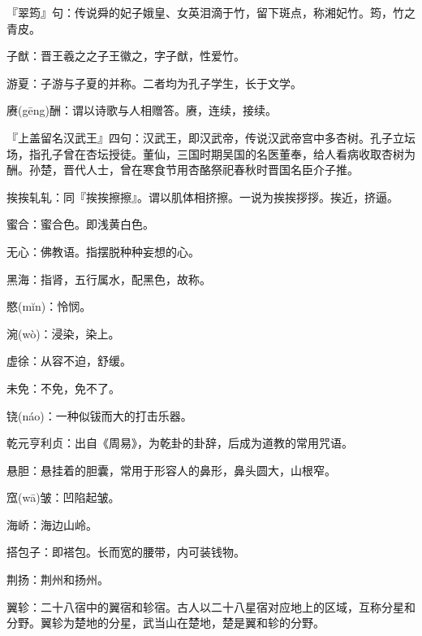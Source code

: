 \startbuffer[1863]
『翠筠』句：传说舜的妃子娥皇、女英泪滴于竹，留下斑点，称湘妃竹。筠，竹之青皮。
\stopbuffer


\startbuffer[1864]
子猷：晋王羲之之子王徽之，字子猷，性爱竹。
\stopbuffer


\startbuffer[1865]
游夏：子游与子夏的并称。二者均为孔子学生，长于文学。
\stopbuffer


\startbuffer[1866]
赓(gēng)酬：谓以诗歌与人相赠答。赓，连续，接续。
\stopbuffer


\startbuffer[1867]
『上盖留名汉武王』四句：汉武王，即汉武帝，传说汉武帝宫中多杏树。孔子立坛场，指孔子曾在杏坛授徒。董仙，三国时期吴国的名医董奉，给人看病收取杏树为酬。孙楚，晋代人士，曾在寒食节用杏酪祭祀春秋时晋国名臣介子推。
\stopbuffer


\startbuffer[1868]
挨挨轧轧：同『挨挨擦擦』。谓以肌体相挤擦。一说为挨挨拶拶。挨近，挤逼。
\stopbuffer


\startbuffer[1869]
蜜合：蜜合色。即浅黄白色。
\stopbuffer


\startbuffer[1870]
无心：佛教语。指摆脱种种妄想的心。
\stopbuffer


\startbuffer[1871]
黑海：指肾，五行属水，配黑色，故称。
\stopbuffer


\startbuffer[1872]
愍(mĭn)：怜悯。
\stopbuffer


\startbuffer[1873]
涴(wò)：浸染，染上。
\stopbuffer


\startbuffer[1874]
虚徐：从容不迫，舒缓。
\stopbuffer


\startbuffer[1875]
未免：不免，免不了。
\stopbuffer


\startbuffer[1876]
铙(náo)：一种似钹而大的打击乐器。
\stopbuffer


\startbuffer[1877]
乾元亨利贞：出自《周易》，为乾卦的卦辞，后成为道教的常用咒语。
\stopbuffer


\startbuffer[1878]
悬胆：悬挂着的胆囊，常用于形容人的鼻形，鼻头圆大，山根窄。
\stopbuffer


\startbuffer[1879]
窊(wā)皱：凹陷起皱。
\stopbuffer


\startbuffer[1880]
海峤：海边山岭。
\stopbuffer


\startbuffer[1881]
搭包子：即褡包。长而宽的腰带，内可装钱物。
\stopbuffer


\startbuffer[1882]
荆扬：荆州和扬州。
\stopbuffer


\startbuffer[1883]
翼轸：二十八宿中的翼宿和轸宿。古人以二十八星宿对应地上的区域，互称分星和分野。翼轸为楚地的分星，武当山在楚地，楚是翼和轸的分野。
\stopbuffer


